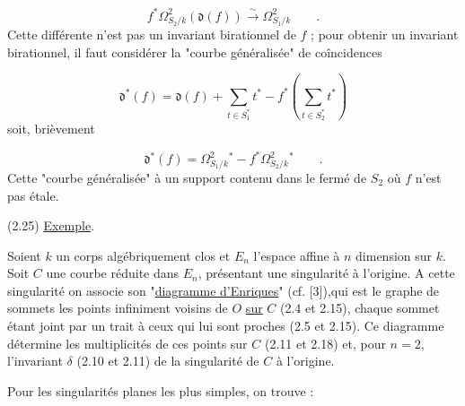 \begin{equation*}
f^* \Omega^2_{S_2/k} (\mathfrak{d}(f)) \overset{\sim}{\longrightarrow} \Omega^2_{S_1/k} \qquad .
\end{equation*}
Cette différente n'est pas un invariant birationnel de $f$ ; pour obtenir un invariant birationnel, il faut considérer la "courbe généralisée" de coîncidences

\begin{equation*}
\mathfrak{d}^*(f) = \mathfrak{d}(f) + \sum_{t \in S_1^*} t^* - f^* ( \sum_{t \in S_2^*} t^*)
\end{equation*}
soit, brièvement

\begin{equation*}
\mathfrak{d}^*(f) = \Omega^2_{S_1/k}{}^* - f^* \Omega^2_{S_2/k}{}^* \qquad .
\end{equation*}
Cette "courbe généralisée" à un support contenu dans le fermé de $S_2$ où $f$ n'est pas étale.



(2.25) \underline{Exemple}.

Soient $k$ un corps algébriquement clos et $E_n$ l'espace affine à $n$ dimension sur $k$. Soit $C$ une courbe réduite dans $E_n$, présentant une singularité à l'origine. A cette singularité on associe son "\underline{diagramme d'Enriques}" (cf. [3]),qui est le graphe de sommets les points infiniment voisins de $O$ \underline{sur} $C$ (2.4 et 2.15), chaque sommet étant joint par un trait à ceux qui lui sont proches (2.5 et 2.15). Ce diagramme détermine les multiplicités de ces points sur $C$ (2.11 et 2.18) et, pour $n = 2$, l'invariant $\delta$ (2.10 et 2.11) de la singularité de $C$ à l'origine.

Pour les singularités planes les plus simples, on trouve :

